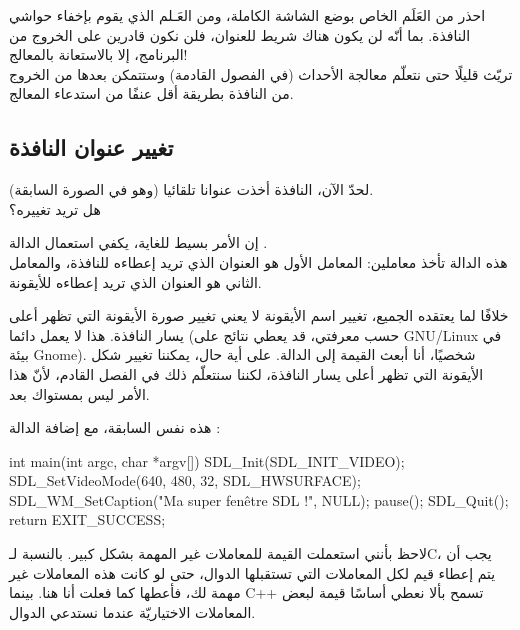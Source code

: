 \begin{warning}
احذر من العَلَم 
الخاص بوضع الشاشة الكاملة، ومن العَـلم 
الذي يقوم بإخفاء حواشي النافذة. بما أنّه لن يكون هناك شريط للعنوان، فلن نكون قادرين على الخروج من البرنامج، إلا بالاستعانة بالمعالج!\\
تريّث قليلًا حتى نتعلّم معالجة الأحداث (في الفصول القادمة) وستتمكن بعدها من الخروج من النافذة بطريقة أقل عنفًا من استدعاء المعالج.
\end{warning}

\subsection{تغيير عنوان النافذة}

لحدّ الآن، النافذة أخذت عنوانا تلقائيا (وهو 
في الصورة السابقة).\\
هل تريد تغييره؟

إن الأمر بسيط للغاية، يكفي استعمال الدالة
.\\
هذه الدالة تأخذ معاملين: المعامل الأول هو العنوان الذي تريد إعطاءه للنافذة، والمعامل الثاني هو العنوان الذي تريد إعطاءه للأيقونة.

خلافًا لما يعتقده الجميع، تغيير اسم الأيقونة لا يعني تغيير صورة الأيقونة التي تظهر أعلى يسار النافذة. هذا لا يعمل دائما (حسب معرفتي، قد يعطي نتائج على \textenglish{GNU/Linux}
في بيئة \textenglish{Gnome}).
شخصيًا، أنا أبعث القيمة
إلى الدالة. على أية حال، يمكننا تغيير شكل الأيقونة التي تظهر أعلى يسار النافذة، لكننا سنتعلّم ذلك في الفصل القادم، لأنّ هذا الأمر ليس بمستواك بعد.

هذه نفس 
السابقة، مع إضافة الدالة
:

\begin{Csource}
int main(int argc, char *argv[])
{
	SDL_Init(SDL_INIT_VIDEO);
	SDL_SetVideoMode(640, 480, 32, SDL_HWSURFACE);
	SDL_WM_SetCaption("Ma super fenêtre SDL !", NULL);
	pause();
	SDL_Quit();
	return EXIT_SUCCESS;
}
\end{Csource}

\begin{information}
لاحظ بأنني استعملت القيمة 
للمعاملات غير المهمة بشكل كبير. بالنسبة لـ\textenglish{C}،
يجب أن يتم إعطاء قيم لكل المعاملات التي تستقبلها الدوال، حتى لو كانت هذه المعاملات غير مهمة لك، فأعطها
كما فعلت أنا هنا. بينما \textenglish{C++}
تسمح بألا نعطي أساسًا قيمة لبعض المعاملات الاختياريّة عندما نستدعي الدوال.
\end{information}

